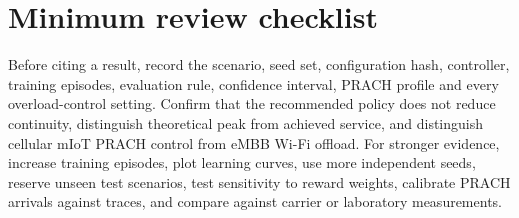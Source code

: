 \documentclass[10pt]{article}
\begin{document}
\section{Minimum review checklist}
Before citing a result, record the scenario, seed set, configuration hash, controller, training episodes, evaluation rule, confidence interval, PRACH profile and every overload-control setting. Confirm that the recommended policy does not reduce continuity, distinguish theoretical peak from achieved service, and distinguish cellular mIoT PRACH control from eMBB Wi-Fi offload. For stronger evidence, increase training episodes, plot learning curves, use more independent seeds, reserve unseen test scenarios, test sensitivity to reward weights, calibrate PRACH arrivals against traces, and compare against carrier or laboratory measurements.
\end{document}
